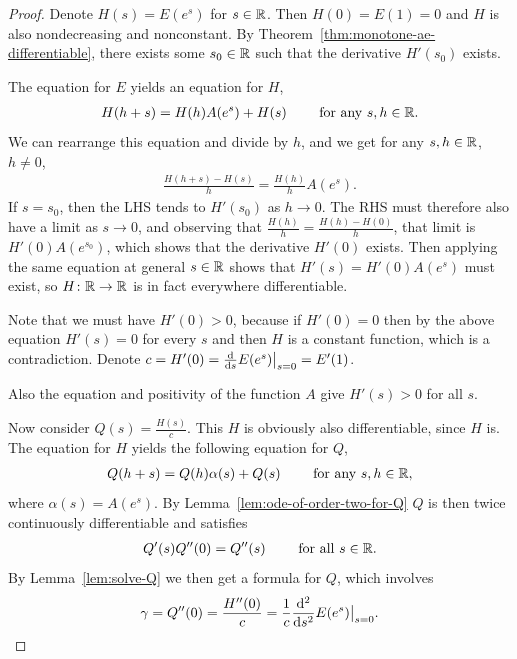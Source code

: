 \begin{proof}
  \leanok
  Denote $H(s) = E(e^s)$ for $s \in \mathbb{R}$. Then $H(0) = E(1) = 0$ and
  $H$ is also nondecreasing and nonconstant.
  By Theorem~\ref{thm:monotone-ae-differentiable}, there
  exists some $s_0 \in \mathbb{R}$ such that the derivative $H'(s_0)$ exists.

  The equation for $E$ yields an equation for $H$,
  \begin{align*}
  H(h+s) = H(h) A(e^{s}) + H(s) \qquad \text{ for any } s, h \in \mathbb{R}.
  \end{align*}
  We can rearrange this equation and divide by $h$,
  and we get for any $s, h \in \mathbb{R}$, $h \ne 0$,
  \begin{align*}
  \frac{H(h+s) - H(s)}{h} = \frac{H(h)}{h} A(e^{s}) .
  \end{align*}
  If $s = s_0$, then the LHS tends to $H'(s_0)$ as $h \to 0$.
  The RHS must therefore also have a limit as $s \to 0$, and
  observing that $\frac{H(h)}{h} = \frac{H(h) - H(0)}{h}$,
  that limit is $H'(0) A(e^{s_0})$, which shows that the derivative $H'(0)$ exists.
  Then applying the same equation at general $s \in \mathbb{R}$ shows that
  $H'(s) = H'(0) A(e^{s})$ must exist, so $H \colon \mathbb{R} \to \mathbb{R}$ is
  in fact everywhere differentiable.

  Note that we must have $H'(0) > 0$, because if $H'(0) = 0$
  then by the above equation $H'(s) = 0$ for every $s$ and then
  $H$ is a constant function, which is a contradiction.
  Denote $c = H'(0) = \frac{\mathrm{d}}{\mathrm{d} s} E(e^s) \big|_{s=0} = E'(1)$.

  Also the equation and positivity of the function $A$ give $H'(s)>0$
  for all $s$. %

  Now consider $Q(s) = \frac{H(s)}{c}$. This $H$ is
  obviously also differentiable, since $H$ is. The equation
  for $H$ yields the following equation for $Q$,
  \begin{align*}
    Q(h+s) = Q(h) \alpha(s) + Q(s) \qquad \text{ for any } s,h \in \mathbb{R} ,
  \end{align*}
  where $\alpha(s) = A(e^{s})$.
  By Lemma~\ref{lem:ode-of-order-two-for-Q} $Q$ is then twice
  continuously differentiable and satisfies
  \begin{align}
  Q'(s) Q'' (0) = Q'' (s) \qquad \text{ for all } s \in \mathbb{R} .
  \end{align}
  By Lemma~\ref{lem:solve-Q} we then get
  a formula for $Q$, which involves
  \begin{align*}
  \gamma = Q''(0) = \frac{H''(0)}{c}
    = \frac{1}{c} \frac{\mathrm{d}^2}{\mathrm{d} {s}^2} E(e^s) \big|_{s = 0} .
  \end{align*}


\end{proof}
